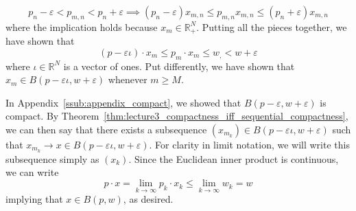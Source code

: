 \documentclass{article}
\newcommand{\R}{\mathbb{R}}
\theoremstyle{mythm}
\theoremstyle{mydef}
\begin{document}
\begin{equation*}
    p_n - \varepsilon < p_{m,n} < p_n + \varepsilon \implies (p_n-\varepsilon) x_{m,n} \leq p_{m,n} x_{m,n} \leq (p_n+\varepsilon)x_{m,n}
\end{equation*}
where the implication holds because $x_m \in \R^N_+$. Putting all the pieces together, we have shown that 
\begin{equation*}
    (p-\varepsilon \iota) \cdot x_m \leq p_m \cdot x_m \leq w_, < w+\varepsilon
\end{equation*}
where $\iota\in\R^N$ is a vector of ones. Put differently, we have shown that $x_m \in B(p-\varepsilon\iota, w+\varepsilon)$ whenever $m\geq M$. 

In Appendix~\ref{ssub:appendix_compact}, we showed that $B(p-\varepsilon, w+\varepsilon)$ is compact. By Theorem~\ref{thm:lecture3_compactness_iff_sequential_compactness}, we can then say that there exists a subsequence $(x_{m_k}) \in B(p-\varepsilon\iota, w+\varepsilon)$ such that $x_{m_k}\to x \in B(p-\varepsilon\iota, w+\varepsilon)$. For clarity in limit notation, we will write this subsequence simply as $(x_k)$. Since the Euclidean inner product is continuous, we can write
\begin{equation*}
    p \cdot x = \lim_{k\to\infty} p_{k} \cdot x_{k} \leq  \lim_{k\to\infty} w_{k} = w
\end{equation*}
implying that $x\in B(p,w)$, as desired.
\end{document}
